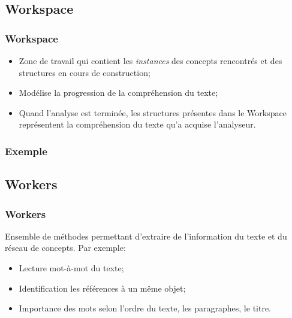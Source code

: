 \documentclass{beamer}
\begin{document}
    \subsection{Workspace}
        \begin{frame}
        \frametitle{Workspace}
            \begin{itemize}
                \item Zone de travail qui contient les \textit{instances} des concepts rencontrés et des structures en cours de construction;
                \item Modélise la progression de la compréhension du texte;
                \item Quand l'analyse est terminée, les structures présentes dans le Workspace représentent la compréhension du texte qu'a acquise l'analyseur.
            \end{itemize}
        \end{frame}

        \begin{frame}
        \frametitle{Exemple}
        \end{frame}

    \subsection{Workers}
        \begin{frame}
        \frametitle{Workers}
            Ensemble de méthodes permettant d'extraire de l'information du texte et du réseau de concepts.\newline{}
            Par exemple:
            \begin{itemize}
                \item Lecture mot-à-mot du texte;
                \item Identification les références à un même objet;
                \item Importance des mots selon l'ordre du texte, les paragraphes, le titre.
            \end{itemize}
        \end{frame}
\end{document}

